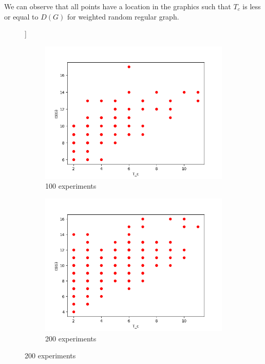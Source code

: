 \documentclass{llncs}
\begin{document}
We can observe that all points have a location in the graphics such that $T_c$ is less or equal to $D(G)$  for weighted random regular graph.
\begin{figure}[p]\label{pic:diagram}]
\begin{subfigure}{0.3\linewidth}
\centering\includegraphics[width=\linewidth]{images/100-consistency-convergence-weighted.png}
\caption{100 experiments}\label{pic:100-w}
\end{subfigure}
\begin{subfigure}{0.3\linewidth}
\centering\includegraphics[width=\linewidth]{images/200-consistency-convergence-weighted.png}
\caption{200 experiments}\label{pic:200-w}
\end{subfigure}

\end{figure}
\end{document}
